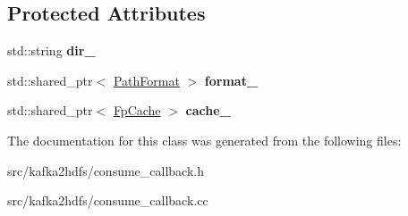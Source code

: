 \subsection*{Protected Attributes}
\begin{DoxyCompactItemize}
\item 
std\+::string {\bfseries dir\+\_\+}\hypertarget{classlog2hdfs_1_1ConsumeCallback_aaa02dc810d0109654bc3546b9e922273}{}\label{classlog2hdfs_1_1ConsumeCallback_aaa02dc810d0109654bc3546b9e922273}

\item 
std\+::shared\+\_\+ptr$<$ \hyperlink{classlog2hdfs_1_1PathFormat}{Path\+Format} $>$ {\bfseries format\+\_\+}\hypertarget{classlog2hdfs_1_1ConsumeCallback_a777aa5749c2c2ce9d77b997b3bea7373}{}\label{classlog2hdfs_1_1ConsumeCallback_a777aa5749c2c2ce9d77b997b3bea7373}

\item 
std\+::shared\+\_\+ptr$<$ \hyperlink{classlog2hdfs_1_1FpCache}{Fp\+Cache} $>$ {\bfseries cache\+\_\+}\hypertarget{classlog2hdfs_1_1ConsumeCallback_abff2281c0f82754845ff68c23d275284}{}\label{classlog2hdfs_1_1ConsumeCallback_abff2281c0f82754845ff68c23d275284}

\end{DoxyCompactItemize}


The documentation for this class was generated from the following files\+:\begin{DoxyCompactItemize}
\item 
src/kafka2hdfs/consume\+\_\+callback.\+h\item 
src/kafka2hdfs/consume\+\_\+callback.\+cc\end{DoxyCompactItemize}
